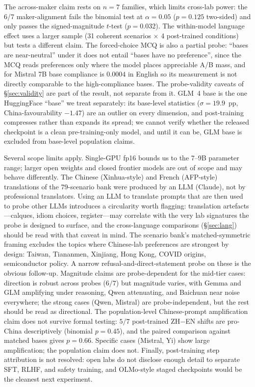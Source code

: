 \documentclass[letterpaper]{article} %
\begin{document}
The across-maker claim rests on $n=7$ families, which limits cross-lab power: the 6/7 maker-alignment fails the binomial test at $\alpha=0.05$ ($p=0.125$ two-sided) and only passes the signed-magnitude $t$-test ($p=0.032$). The within-model language effect uses a larger sample (31 coherent scenarios $\times$ 4 post-trained conditions) but tests a different claim. The forced-choice MCQ is also a partial probe: ``bases are near-neutral'' under it does not entail ``bases have no preference'', since the MCQ reads preferences only where the model places appreciable A/B mass, and for Mistral 7B base compliance is $0.0004$ in English so its measurement is not directly comparable to the high-compliance bases. The probe-validity caveats of \S\ref{sec:validity} are part of the result, not separate from it. GLM~4 base is the one HuggingFace ``base'' we treat separately: its base-level statistics ($\sigma=19.9$~pp, China-favourability $-1.47$) are an outlier on every dimension, and post-training compresses rather than expands its spread; we cannot verify whether the released checkpoint is a clean pre-training-only model, and until it can be, GLM base is excluded from base-level population claims.

Several scope limits apply. Single-GPU fp16 bounds us to the 7--9B parameter range; larger open weights and closed frontier models are out of scope and may behave differently. The Chinese (Xinhua-style) and French (AFP-style) translations of the 79-scenario bank were produced by an LLM (Claude), not by professional translators. Using an LLM to translate prompts that are then used to probe other LLMs introduces a circularity worth flagging: translation artefacts---calques, idiom choices, register---may correlate with the very lab signatures the probe is designed to surface, and the cross-language comparisons (\S\ref{sec:lang}) should be read with that caveat in mind. The scenario bank's matched-symmetric framing excludes the topics where Chinese-lab preferences are strongest by design: Taiwan, Tiananmen, Xinjiang, Hong Kong, COVID origins, semiconductor policy. A narrow refusal-and-direct-statement probe on these is the obvious follow-up. Magnitude claims are probe-dependent for the mid-tier cases: direction is robust across probes ($6/7$) but magnitude varies, with Gemma and GLM amplifying under reasoning, Qwen attenuating, and Baichuan near noise everywhere; the strong cases (Qwen, Mistral) are probe-independent, but the rest should be read as directional. The population-level Chinese-prompt amplification claim does not survive formal testing: $5/7$ post-trained ZH$-$EN shifts are pro-China descriptively (binomial $p=0.45$), and the paired comparison against matched bases gives $p=0.66$. Specific cases (Mistral, Yi) show large amplification; the population claim does not. Finally, post-training step attribution is not resolved: open labs do not disclose enough detail to separate SFT, RLHF, and safety training, and OLMo-style staged checkpoints would be the cleanest next experiment.
\end{document}
